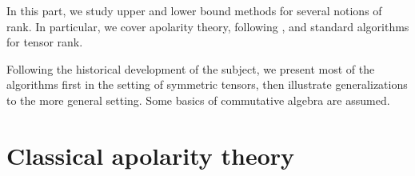 In this part, we study upper and lower bound methods for several notions of rank. In particular, we cover apolarity theory, following \cite{IK99}, and standard algorithms for tensor rank.

Following the historical development of the subject, we present most of the algorithms first in the setting of symmetric tensors, then illustrate generalizations to the more general setting. Some basics of commutative algebra are assumed.

\chapter{Classical apolarity theory}
\label{tensorRank-chapter-apolarity}


